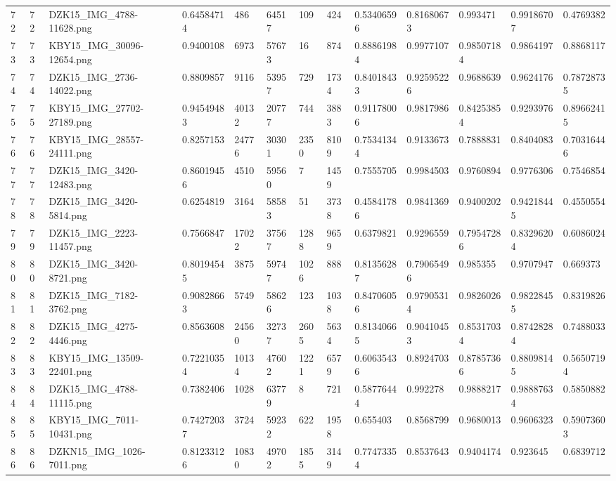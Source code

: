 \documentclass[11pt, a4paper, twoside]{report}
\begin{document}
\begin{longtable}[c]{@{}lllllllllllll@{}}
72 & 72 & DZK15\_IMG\_4788-11628.png & 0.64584714 & 486 & 64517 & 109 & 424 & 0.53406596 & 0.81680673 & 0.993471 & 0.99186707 & 0.4769382 \\
73 & 73 & KBY15\_IMG\_30096-12654.png & 0.9400108 & 6973 & 57673 & 16 & 874 & 0.88861984 & 0.9977107 & 0.98507184 & 0.9864197 & 0.8868117 \\
74 & 74 & DZK15\_IMG\_2736-14022.png & 0.8809857 & 9116 & 53957 & 729 & 1734 & 0.84018433 & 0.92595226 & 0.9688639 & 0.9624176 & 0.78728735 \\
75 & 75 & KBY15\_IMG\_27702-27189.png & 0.94549483 & 40132 & 20777 & 744 & 3883 & 0.91178006 & 0.9817986 & 0.84253854 & 0.9293976 & 0.89662415 \\
76 & 76 & KBY15\_IMG\_28557-24111.png & 0.8257153 & 24776 & 30301 & 2350 & 8109 & 0.75341344 & 0.9133673 & 0.7888831 & 0.8404083 & 0.70316446 \\
77 & 77 & DZK15\_IMG\_3420-12483.png & 0.86019456 & 4510 & 59560 & 7 & 1459 & 0.7555705 & 0.9984503 & 0.9760894 & 0.9776306 & 0.7546854 \\
78 & 78 & DZK15\_IMG\_3420-5814.png & 0.6254819 & 3164 & 58583 & 51 & 3738 & 0.45841786 & 0.9841369 & 0.9400202 & 0.94218445 & 0.4550554 \\
79 & 79 & DZK15\_IMG\_2223-11457.png & 0.7566847 & 17022 & 37567 & 1288 & 9659 & 0.6379821 & 0.9296559 & 0.79547286 & 0.83296204 & 0.6086024 \\
80 & 80 & DZK15\_IMG\_3420-8721.png & 0.80194545 & 3875 & 59747 & 1026 & 888 & 0.81356287 & 0.79065496 & 0.985355 & 0.9707947 & 0.669373 \\
81 & 81 & DZK15\_IMG\_7182-3762.png & 0.90828663 & 5749 & 58626 & 123 & 1038 & 0.84706056 & 0.97905314 & 0.9826026 & 0.98228455 & 0.8319826 \\
82 & 82 & DZK15\_IMG\_4275-4446.png & 0.8563608 & 24560 & 32737 & 2605 & 5634 & 0.81340665 & 0.90410453 & 0.85317034 & 0.87428284 & 0.7488033 \\
83 & 83 & KBY15\_IMG\_13509-22401.png & 0.72210354 & 10134 & 47602 & 1221 & 6579 & 0.60635436 & 0.8924703 & 0.87857366 & 0.88098145 & 0.56507194 \\
84 & 84 & DZK15\_IMG\_4788-11115.png & 0.7382406 & 1028 & 63779 & 8 & 721 & 0.58776444 & 0.992278 & 0.9888217 & 0.98887634 & 0.5850882 \\
85 & 85 & KBY15\_IMG\_7011-10431.png & 0.74272037 & 3724 & 59232 & 622 & 1958 & 0.655403 & 0.8568799 & 0.9680013 & 0.9606323 & 0.59073603 \\
86 & 86 & DZKN15\_IMG\_1026-7011.png & 0.81233126 & 10830 & 49702 & 1855 & 3149 & 0.77473354 & 0.8537643 & 0.9404174 & 0.923645 & 0.6839712 \\

\end{longtable}
\end{document}

